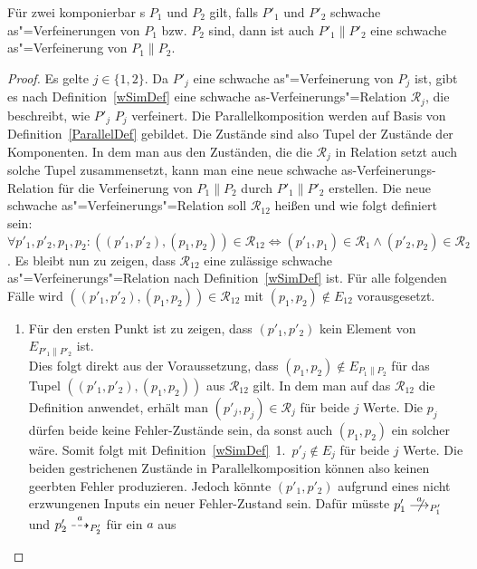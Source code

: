 \begin{Lem}
  \label{schwVerfParallelLem}
  Für zwei komponierbar \MEIO{}s $P_1$ und $P_2$ gilt, falls $P'_1$ und $P'_2$
  schwache as"=Verfeinerungen von $P_1$ bzw. $P_2$ sind, dann ist auch
  $P'_1\|P'_2$ eine schwache as"=Verfeinerung von $P_1\|P_2$.
\end{Lem}
\begin{proof}
  Es gelte $j\in\{1,2\}$. Da $P'_j$ eine schwache as"=Verfeinerung von $P_j$
  ist, gibt es nach Definition~\ref{wSimDef} eine schwache
  as-Verfeinerungs"=Relation $\mathcal{R}_j$, die beschreibt, wie $P'_j$ $P_j$
  verfeinert. Die Parallelkomposition werden auf Basis von
  Definition~\ref{ParallelDef} gebildet. Die Zustände sind also Tupel der
  Zustände der Komponenten. In dem man aus den Zuständen, die die
  $\mathcal{R}_j$ in Relation setzt auch solche Tupel zusammensetzt, kann man
  eine neue schwache as-Verfeinerungs-Relation für die Verfeinerung von
  $P_1\|P_2$ durch $P'_1\|P'_2$ erstellen. Die neue schwache
  as"=Verfeinerungs"=Relation soll $\mathcal{R}_{12}$ heißen und wie folgt
  definiert sein: $\forall p'_1,p'_2,p_1,p_2:
  ((p'_1,p'_2),(p_1,p_2))\in\mathcal{R}_{12} \Leftrightarrow
  (p'_1,p_1)\in\mathcal{R}_1 \land (p'_2,p_2)\in\mathcal{R}_2$. Es bleibt nun
  zu zeigen, dass $\mathcal{R}_{12}$ eine zulässige schwache
  as"=Verfeinerungs"=Relation nach Definition~\ref{wSimDef} ist. Für alle
  folgenden Fälle wird $((p'_1,p'_2),(p_1,p_2))\in\mathcal{R}_{12}$ mit
  $(p_1,p_2)\notin E_{12}$ vorausgesetzt.
  \begin{enumerate}
    \item Für den ersten Punkt ist zu zeigen, dass $(p'_1,p'_2)$ kein Element
      von $E_{P'_1\|P'_2}$ ist.\\
      Dies folgt direkt aus der Voraussetzung, dass $(p_1,p_2)\notin
      E_{P_1\|P_2}$ für das Tupel $((p'_1,p'_2),(p_1,p_2))$ aus
      $\mathcal{R}_{12}$ gilt. In dem man auf das $\mathcal{R}_{12}$ die
      Definition anwendet, erhält man $(p'_j,p_j)\in\mathcal{R}_j$ für beide
      $j$ Werte. Die $p_j$ dürfen beide keine Fehler-Zustände sein, da sonst
      auch $(p_1,p_2)$ ein solcher wäre. Somit folgt mit
      Definition~\ref{wSimDef}~1.\ $p'_j\notin E_j$ für beide $j$ Werte. Die
      beiden gestrichenen Zustände in Parallelkomposition können also keinen
      geerbten Fehler produzieren. Jedoch könnte $(p'_1,p'_2)$ aufgrund eines
      nicht erzwungenen Inputs ein neuer Fehler-Zustand sein. Dafür müsste
      \oBdA{} $p'_1\nmust[a]_{P'_1}$ und $p'_2\may[a]_{P'_2}$ für ein $a$ aus

\end{enumerate}
\end{proof}

